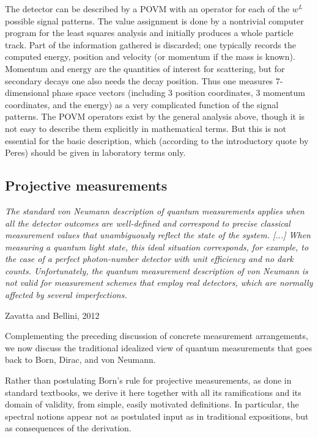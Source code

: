 \documentclass[12pt]{article}
\begin{document}
The detector can be described by a POVM with an operator for each of
the $w^L$ possible signal patterns. The value assignment is done by a
nontrivial computer program for the least squares analysis and initially
produces a whole particle track.  Part of the information gathered
is discarded; one typically records the computed energy, position and
velocity (or momentum if the mass is known). Momentum and energy are the
quantities of interest for scattering, but for secondary decays one
also needs the decay position. Thus one measures 7-dimensional phase
space vectors (including 3 position coordinates, 3 momentum coordinates,
and the energy) as a very complicated function of the signal patterns.
The POVM operators exist by the general analysis above, though it is
not easy to describe them explicitly in mathematical terms. But this is
not essential for the basic description, which (according to the
introductory quote by Peres) should be given in laboratory terms only.



\subsection{Projective measurements}\label{ss.proj}

\nopagebreak
\hfill\parbox[t]{10.8cm}{\footnotesize

{\em The standard von Neumann description of quantum measurements
applies when all the detector outcomes are well-defined and correspond
to precise classical measurement values that unambiguously reflect the
state of the system. [...]
When measuring a quantum light state, this ideal situation corresponds,
for example, to the case of a perfect photon-number detector
with unit efficiency and no dark counts. Unfortunately, the quantum
measurement description of von Neumann is not valid for measurement
schemes that employ real detectors, which are normally affected by
several imperfections.}

\hfill Zavatta and Bellini, 2012 \cite{ZavB}
}

\bigskip

Complementing the preceding discussion of concrete measurement
arrangements, we now discuss the traditional idealized view of quantum
measurements that goes back to Born, Dirac, and von Neumann.

Rather than postulating Born's rule for projective measurements, as done
in standard textbooks, we derive it here together with all its
ramifications and its domain of validity, from simple, easily motivated
definitions. In particular, the spectral notions appear not as
postulated input as in traditional expositions, but as consequences of
the derivation.
\end{document}
